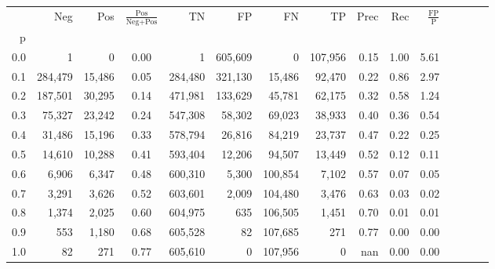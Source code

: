 \begin{tabular}{rrrcrrrrrrrrrrr}
\toprule
{} &      Neg &     Pos & $\frac{\text{Pos}}{\text{Neg}+\text{Pos}}$ &       TN &       FP &       FN &       TP &  Prec &   Rec & $\frac{\text{FP}}{\text{P}}$ \\
p   &          &         &                                            &          &          &          &          &       &       &                              \\
\midrule
0.0 &        1 &       0 &                                       0.00 &        1 &  605,609 &        0 &  107,956 &  0.15 &  1.00 &                         5.61 \\
0.1 &  284,479 &  15,486 &                                       0.05 &  284,480 &  321,130 &   15,486 &   92,470 &  0.22 &  0.86 &                         2.97 \\
0.2 &  187,501 &  30,295 &                                       0.14 &  471,981 &  133,629 &   45,781 &   62,175 &  0.32 &  0.58 &                         1.24 \\
0.3 &   75,327 &  23,242 &                                       0.24 &  547,308 &   58,302 &   69,023 &   38,933 &  0.40 &  0.36 &                         0.54 \\
0.4 &   31,486 &  15,196 &                                       0.33 &  578,794 &   26,816 &   84,219 &   23,737 &  0.47 &  0.22 &                         0.25 \\
0.5 &   14,610 &  10,288 &                                       0.41 &  593,404 &   12,206 &   94,507 &   13,449 &  0.52 &  0.12 &                         0.11 \\
0.6 &    6,906 &   6,347 &                                       0.48 &  600,310 &    5,300 &  100,854 &    7,102 &  0.57 &  0.07 &                         0.05 \\
0.7 &    3,291 &   3,626 &                                       0.52 &  603,601 &    2,009 &  104,480 &    3,476 &  0.63 &  0.03 &                         0.02 \\
0.8 &    1,374 &   2,025 &                                       0.60 &  604,975 &      635 &  106,505 &    1,451 &  0.70 &  0.01 &                         0.01 \\
0.9 &      553 &   1,180 &                                       0.68 &  605,528 &       82 &  107,685 &      271 &  0.77 &  0.00 &                         0.00 \\
1.0 &       82 &     271 &                                       0.77 &  605,610 &        0 &  107,956 &        0 &   nan &  0.00 &                         0.00 \\
\bottomrule
\end{tabular}
